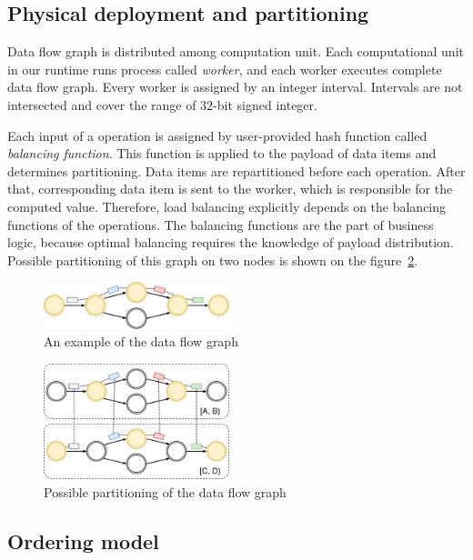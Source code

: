 \subsection{Physical deployment and partitioning}
Data flow graph is distributed among computation unit. Each computational unit in our runtime runs process called {\it worker}, and each worker executes complete data flow graph. Every worker is assigned by an integer interval. Intervals are not intersected and cover the range of 32-bit signed integer.

Each input of a operation is assigned by user-provided hash function called {\it balancing function}. This function is applied to the payload of data items and determines partitioning. Data items are repartitioned before each operation. After that, corresponding data item is sent to the worker, which is responsible for the computed value. Therefore, load balancing explicitly depends on the balancing functions of the operations. The balancing functions are the part of business logic, because optimal balancing requires the knowledge of payload distribution. Possible partitioning of this graph on two nodes is shown on the figure~\ref{physical-graph-figure}.

\begin{figure}[htbp]
  \centering
  \includegraphics[width=0.48\textwidth]{pics/logical-graph}
  \caption{An example of the data flow graph}
  \label {logical-graph-figure}
\end{figure}

\begin{figure}[htbp]
  \centering
  \includegraphics[width=0.48\textwidth]{pics/physical-graph}
  \caption{Possible partitioning of the data flow graph}
  \label {physical-graph-figure}
\end{figure}

\subsection{Ordering model}

